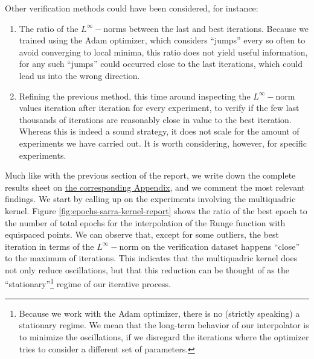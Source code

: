 \documentclass[12pt]{report} %
\begin{document}
Other verification methods could have been considered, for instance:
\begin{enumerate}
    \item The ratio of the $L^\infty-$norms between the last and best iterations. Because we trained using the Adam optimizer, which considers ``jumps'' every so often to avoid converging to local minima, this ratio does not yield useful information, for any such ``jumps'' could occurred close to the last iterations, which could lead us into the wrong direction.
    \item Refining the previous method, this time around inspecting the $L^\infty-$norm values iteration after iteration for every experiment, to verify if the few last thousands of iterations are reasonably close in value to the best iteration. Whereas this is indeed a sound strategy, it does not scale for the amount of experiments we have carried out. %
    It is worth considering, however, for specific experiments. \label{option-method}
\end{enumerate}

Much like with the previous section of the report, we write down the complete results sheet on \hyperref[appendix-1d]{the corresponding Appendix}, and we comment the most relevant findings. We start by calling up on the experiments involving the multiquadric kernel. Figure \ref{fig:epochs-sarra-kernel-report} shows the ratio of the best epoch to the number of total epochs for the interpolation of the Runge function with equispaced points. We can observe that, except for some outliers, the best iteration in terms of the $L^\infty-$norm on the verification dataset happens ``close'' to the maximum of iterations. This indicates that the multiquadric kernel does not only reduce oscillations, but that this reduction can be thought of as the ``stationary''\footnote{Because we work with the Adam optimizer, there is no (strictly speaking) a stationary regime. We mean that the long-term behavior of our interpolator is to minimize the oscillations, if we disregard the iterations where the optimizer tries to consider a different set of parameters.} regime of our iterative process.
\end{document}
